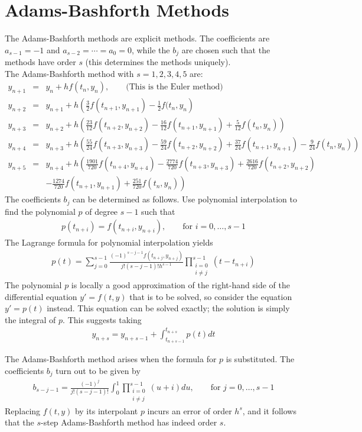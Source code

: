 \documentclass[11pt]{report}
\newcommand{\sps}{\\[0.2cm]}
\newcommand{\NI}{\noindent}
\begin{document}
	\section{Adams-Bashforth Methods}
	The Adams-Bashforth methods are explicit methods. The coefficients are $a_{s-1} = -1$ and $a_{s-2} = \cdots = a_0 = 0$, while the $b_j$ are chosen such that the methods have order $s$ (this determines the methods uniquely).\sps
	The Adams-Bashforth method with $s=1,2,3,4,5$ are:
	\begin{eqnarray*}
		y_{n+1} &=& y_n + hf(t_n,y_n),\qquad \text{(This is the Euler method)}\sps
		y_{n+2} &=& y_{n+1} + h\left(\frac{3}{2}f(t_{n+1}, y_{n+1}) - \frac{1}{2}f(t_n, y_n\right)\sps
		y_{n+3} &=& y_{n+2} + h\left(\frac{23}{12}f(t_{n+2}, y_{n+2}) - \frac{16}{12}f(t_{n+1}, y_{n+1}) + \frac{5}{12}f(t_n,y_n)\right)\sps
		y_{n+4} &=& y_{n+3} + h\left(\frac{55}{24}f(t_{n+3}, y_{n+3}) - \frac{59}{24}f(t_{n+2}, y_{n+2}) + \frac{37}{24}f(t_{n+1}, y_{n+1}) - \frac{9}{24}f(t_n,y_n)\right)\sps
		y_{n+5} &=& y_{n+4} + h\left( \frac{1901}{720}f(t_{n+4}, y_{n+4}) - \frac{2774}{720}f(t_{n+3}, y_{n+3}) + \frac{2616}{720}f(t_{n+2}, y_{n+2}) \right.\sps
		&&\left.- \frac{1274}{720}f(t_{n+1}, y_{n+1}) + \frac{251}{720}f(t_n,y_n)
		\right)
	\end{eqnarray*}
	The coefficients $b_j$ can be determined as follows. Use polynomial interpolation to find the polynomial $p$ of degree $s-1$ such that
	\begin{eqnarray*}
		p(t_{n+i}) = f(t_{n+i}, y_{n+i}),\qquad \text{for } i = 0,\ldots, s-1
	\end{eqnarray*}
	The Lagrange formula for polynomial interpolation yields
	\begin{eqnarray*}
		p(t) = \sum_{j=0}^{s-1}\frac{(-1)^{s-j-1}  f(t_{n+j}, y_{n+j})}{j!(s-j-1)!h^{s-1}}\prod_{\substack{i=0\\i\neq j}}^{s-1}(t-t_{n+i})
	\end{eqnarray*}
	The polynomial $p$ is locally a good approximation of the right-hand side of the differential equation $y' = f(t,y)$ that is to be solved, so consider the equation $y' = p(t)$ instead. This equation can be solved exactly; the solution is simply the integral of $p$. This suggests taking 
	\begin{eqnarray*}
		y_{n+s} = y_{n+s-1} + \int_{t_{n+s-1}}^{t_{n+s}}p(t) dt
	\end{eqnarray*}	
	
	\NI The Adams-Bashforth method arises when the formula for $p$ is substituted. The coefficients $b_j$ turn out to be given by
	\begin{eqnarray*}
		b_{s-j-1} = \frac{(-1)^j}{j!(s-j-1)!}\int_{0}^{1}\prod_{\substack{i=0\\i\neq j}}^{s-1}(u+i)du,\qquad \text{for } j=0,\ldots, s-1
	\end{eqnarray*}
	Replacing $f(t,y)$ by its interpolant $p$ incurs an error of order $h^s$, and it follows that the $s$-step Adams-Bashforth method has indeed order $s$.\\
	
\end{document}
